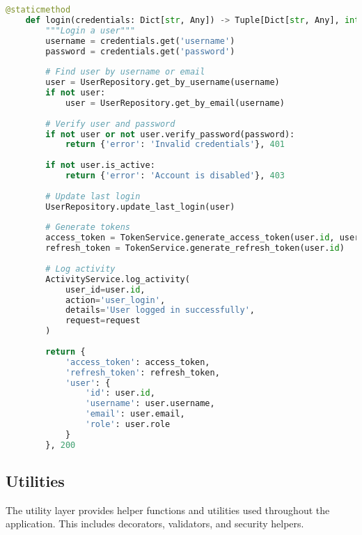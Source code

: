 \documentclass{article}
\begin{document}
\begin{lstlisting}[language=python, caption=Auth Service in app/services/auth\_service.py]
    @staticmethod
    def login(credentials: Dict[str, Any]) -> Tuple[Dict[str, Any], int]:
        """Login a user"""
        username = credentials.get('username')
        password = credentials.get('password')
        
        # Find user by username or email
        user = UserRepository.get_by_username(username)
        if not user:
            user = UserRepository.get_by_email(username)
        
        # Verify user and password
        if not user or not user.verify_password(password):
            return {'error': 'Invalid credentials'}, 401
        
        if not user.is_active:
            return {'error': 'Account is disabled'}, 403
        
        # Update last login
        UserRepository.update_last_login(user)
        
        # Generate tokens
        access_token = TokenService.generate_access_token(user.id, user.role)
        refresh_token = TokenService.generate_refresh_token(user.id)
        
        # Log activity
        ActivityService.log_activity(
            user_id=user.id,
            action='user_login',
            details='User logged in successfully',
            request=request
        )
        
        return {
            'access_token': access_token,
            'refresh_token': refresh_token,
            'user': {
                'id': user.id,
                'username': user.username,
                'email': user.email,
                'role': user.role
            }
        }, 200
\end{lstlisting}

\subsection{Utilities}

The utility layer provides helper functions and utilities used throughout the application. This includes decorators, validators, and security helpers.
\end{document}
